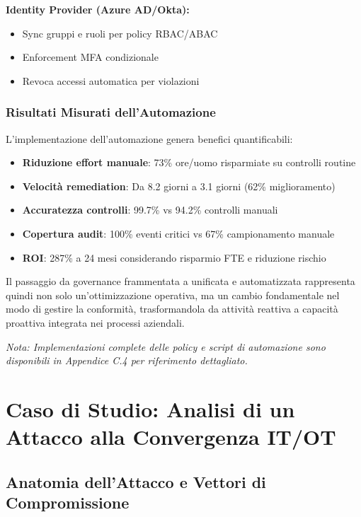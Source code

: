 \textbf{Identity Provider (Azure AD/Okta):}
\begin{itemize}
    \item Sync gruppi e ruoli per policy RBAC/ABAC
    \item Enforcement MFA condizionale
    \item Revoca accessi automatica per violazioni
\end{itemize}

\subsubsection{Risultati Misurati dell'Automazione}

L'implementazione dell'automazione genera benefici quantificabili:

\begin{itemize}
    \item \textbf{Riduzione effort manuale}: 73\% ore/uomo risparmiate su controlli routine
    \item \textbf{Velocità remediation}: Da 8.2 giorni a 3.1 giorni (62\% miglioramento)
    \item \textbf{Accuratezza controlli}: 99.7\% vs 94.2\% controlli manuali
    \item \textbf{Copertura audit}: 100\% eventi critici vs 67\% campionamento manuale
    \item \textbf{ROI}: 287\% a 24 mesi considerando risparmio FTE e riduzione rischio
\end{itemize}

Il passaggio da governance frammentata a unificata e automatizzata rappresenta quindi non solo un'ottimizzazione operativa, ma un cambio fondamentale nel modo di gestire la conformità, trasformandola da attività reattiva a capacità proattiva integrata nei processi aziendali.

\textit{Nota: Implementazioni complete delle policy e script di automazione sono disponibili in Appendice C.4 per riferimento dettagliato.}

\section{\texorpdfstring{\textbf{Caso di Studio: Analisi di un Attacco alla Convergenza IT/OT}}{4.5 - Caso di Studio: Analisi di un Attacco alla Convergenza IT/OT}}

\subsection{Anatomia dell'Attacco e Vettori di Compromissione}

